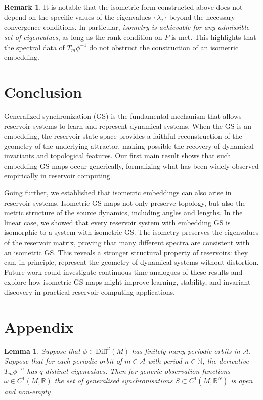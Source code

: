 \documentclass{article}
\newtheorem{lemma}[theorem]{Lemma}
\theoremstyle{definition}
\theoremstyle{definition}
\newtheorem{remark}[theorem]{Remark}
\numberwithin{theorem}{section}
\begin{document}
\begin{remark}
It is notable that the isometric form constructed above does not depend on the specific values of 
the eigenvalues $\{\lambda_j\}$ beyond the necessary convergence conditions. 
In particular, \emph{isometry is achievable for any admissible set of eigenvalues}, as long as the 
rank condition on $P$ is met. This highlights that the spectral data of $T_m\phi^{-1}$ do not 
obstruct the construction of an isometric embedding.
\end{remark}

\section{Conclusion}

Generalized synchronization (GS) is the fundamental mechanism that allows 
reservoir systems to learn and represent dynamical systems. 
When the GS is an embedding, the reservoir state space provides a faithful 
reconstruction of the geometry of the underlying attractor, making possible the 
recovery of dynamical invariants and topological features. 
Our first main result shows that such embedding GS maps occur generically, 
formalizing what has been widely observed empirically in reservoir computing. 

Going further, we established that isometric embeddings can also arise in 
reservoir systems. Isometric GS maps not only preserve topology, but also the 
metric structure of the source dynamics, including angles and lengths. 
In the linear case, we showed that every reservoir system with embedding GS is isomorphic to a system with isometric GS. The isometry preserves the eigenvalues of the reservoir matrix, proving that many different spectra are consistent with an isometric GS. This reveals a stronger structural 
property of reservoirs: they can, in principle, represent the geometry of 
dynamical systems without distortion. Future work could investigate continuous-time analogues of these results and explore how isometric GS maps might improve learning, stability, and invariant discovery in practical reservoir computing applications.


\section*{Appendix}

\begin{lemma}
\label{lem::open_nonempty}
     Suppose that $\phi \in \mathrm{Diff}^2(M)$ has finitely many periodic orbits in $\mathcal{A}$. Suppose that for each periodic orbit of $m \in \mathcal{A}$ with period $n \in \mathbb{N}$, the derivative $T_m \phi^{-n}$ has $q$ distinct eigenvalues. Then for generic observation functions $\omega \in C^1(M,\mathbb{R})$ the set of generalised synchronisations $S \subset C^1(M,\mathbb{R}^N)$ is open and non-empty
\end{lemma}
\end{document}
